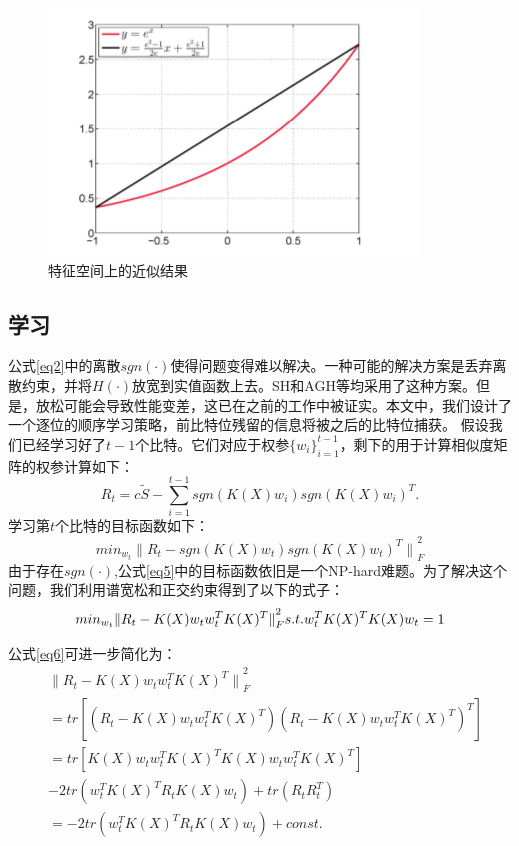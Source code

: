 \documentclass{article}
\begin{document}
\begin{figure}[htbp]%
\centering
\includegraphics[width=0.5\paperwidth]{figure1.png}
\caption{特征空间上的近似结果}
\label{fig:one}
\end{figure}

\subsection{学习}
公式\ref{eq2}中的离散$sgn(\cdot)$使得问题变得难以解决。一种可能的解决方案是丢弃离散约束，并将$H(\cdot)$放宽到实值函数上去。SH\cite{NIPS2008_3383}和AGH\cite{Liu2011Hashing}等均采用了这种方案。但是，放松可能会导致性能变差，这已在之前的工作中被证实\cite{W2012Isotropic,Zhang2014Large}。本文中，我们设计了一个逐位的顺序学习策略，前比特位残留的信息将被之后的比特位捕获\cite{6247912,Zhang2014Large}。
假设我们已经学习好了$t-1$个比特。它们对应于权参$\{w_i\}^{t-1}_{i=1}$，剩下的用于计算相似度矩阵的权参计算如下：
\begin{equation}
R_t=c\tilde{S}-\sum^{t-1}_{i=1}{sgn(K(X)w_i)sgn(K(X)w_i)^T}.
\end{equation}
学习第$t$个比特的目标函数如下：
\begin{displaymath}
min_{w_t}{\|R_t-sgn(K(X)w_t)sgn(K(X)w_t)^T\|}^2_F
\label{eq5}
\end{displaymath}
由于存在$sgn(\cdot)$,公式\ref{eq5}中的目标函数依旧是一个NP-hard难题。为了解决这个问题，我们利用谱宽松\cite{NIPS2008_3383}和正交约束得到了以下的式子：
\begin{equation}
min_{w_t}{\|R_t-K(X)w_tw_t^TK(X)^T\|}^2_F\\
s.t. w^T_tK(X)^TK(X)w_t=1
\label{eq6}
\end{equation}

公式\ref{eq6}可进一步简化为：
\begin{equation*}
\begin{split}
&{\|R_t-K(X)w_tw_t^TK(X)^T\|}^2_F\\
 &=tr[(R_t-K(X)w_tw_t^TK(X)^T)(R_t-K(X)w_tw_t^TK(X)^T)^T]\\
 &=tr[K(X)w_tw_t^TK(X)^TK(X)w_tw_t^TK(X)^T]\\
  & -2tr(w^T_tK(X)^TR_tK(X)w_t)+tr(R_tR^T_t)\\
& =-2tr(w^T_tK(X)^TR_tK(X)w_t)+const.
\end{split}
\end{equation*}
\end{document}
